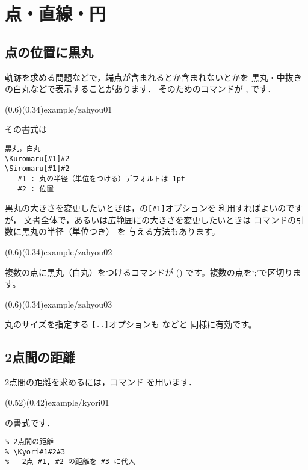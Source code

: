 \section{点・直線・円}
\subsection{点の位置に黒丸}
軌跡を求める問題などで，端点が含まれるとか含まれないとかを
黒丸・中抜きの白丸などで表示することがあります．
そのためのコマンドが ,  です．

\showexample[黒丸・白丸](0.6)(0.34){example/zahyou01}

その書式は

\begin{boxnote}
\begin{verbatim}
黒丸，白丸
\Kuromaru[#1]#2
\Siromaru[#1]#2
   #1 : 丸の半径（単位をつける）デフォルトは 1pt
   #2 : 位置
\end{verbatim}
\end{boxnote}

黒丸の大きさを変更したいときは，の\verb/[#1]/オプションを
利用すればよいのですが，
文書全体で，あるいは広範囲にの大きさを変更したいときは
コマンドの引数に黒丸の半径（単位つき） を
与える方法もあります。

\showexample[黒丸の大きさ](0.6)(0.34){example/zahyou02}

複数の点に黒丸（白丸）をつけるコマンドが ()
です。複数の点を`;'で区切ります。

\showexample[複数の点に黒丸](0.6)(0.34){example/zahyou03}

丸のサイズを指定する \texttt{[..]}オプションも  などと
同様に有効です。

\subsection{2点間の距離}
2点間の距離を求めるには，コマンド  を用います．

    (0.52)(0.42){example/kyori01}\bigskip

 の書式です．

\begin{boxnote}
\begin{verbatim}
% 2点間の距離
% \Kyori#1#2#3
%   2点 #1, #2 の距離を #3 に代入
\end{verbatim}
\end{boxnote}\bigskip

